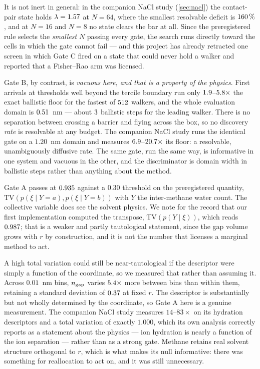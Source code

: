 It is not inert in general: in the companion NaCl study (\cref{sec:nacl}) the contact-pair state
holds $\lambda = 1.57$ at $N = 64$, where the smallest resolvable deficit is
$160\,\%$, and at $N = 16$ and $N = 8$ no state clears the bar at all. Since the preregistered rule selects the
\emph{smallest} $N$ passing every gate, the search runs directly toward the cells in which the
gate cannot fail --- and this project has already retracted one screen in which Gate C fired on a
state that could never hold a walker and reported that a Fisher--Rao arm was licensed.

Gate B, by contrast, is \emph{vacuous here, and that is a property of the physics}. First
arrivals at thresholds well beyond the tercile boundary run only $1.9$--$5.8
\times$ the exact ballistic floor for the fastest of $512$ walkers, and the whole
evaluation domain is $0.51$~nm --- about $3$ ballistic steps for the
leading walker. There is no separation between crossing a barrier and flying across the box, so
no discovery \emph{rate} is resolvable at any budget. The companion NaCl study runs the identical
gate on a $1.20$~nm domain and measures $6.9$--$20.7\times$ its floor: a
resolvable, unambiguously diffusive rate. The same gate, run the same way, is informative in one
system and vacuous in the other, and the discriminator is domain width in ballistic steps rather
than anything about the method.

Gate A passes at $0.935$ against a $0.30$ threshold on the preregistered quantity,
$\mathrm{TV}(p(\xi \mid Y=a), p(\xi \mid Y=b))$ with $Y$ the inter-methane water count. The
collective variable does see the solvent physics. We note for the record that our first
implementation computed the transpose, $\mathrm{TV}(p(Y \mid \xi))$, which reads $
0.987$; that is a weaker and partly tautological statement, since the gap volume
grows with $r$ by construction, and it is not the number that licenses a marginal method to act.

A high total variation could still be near-tautological if the descriptor were simply a function
of the coordinate, so we measured that rather than assuming it. Across $0.01$~nm bins, $n_{\rm
gap}$ varies $5.4\times$ more between bins than within them, retaining a standard
deviation of $0.37$ at fixed $r$. The descriptor is substantially but not wholly
determined by the coordinate, so Gate A here is a genuine measurement. The companion NaCl study
measures $14$--$83\times$ on its hydration descriptors and a total variation of exactly $1.000$,
which its own analysis correctly reports as a statement about the physics --- ion hydration is
nearly a function of the ion separation --- rather than as a strong gate. Methane retains real
solvent structure orthogonal to $r$, which is what makes its null informative: there was
something for reallocation to act on, and it was still unnecessary.

